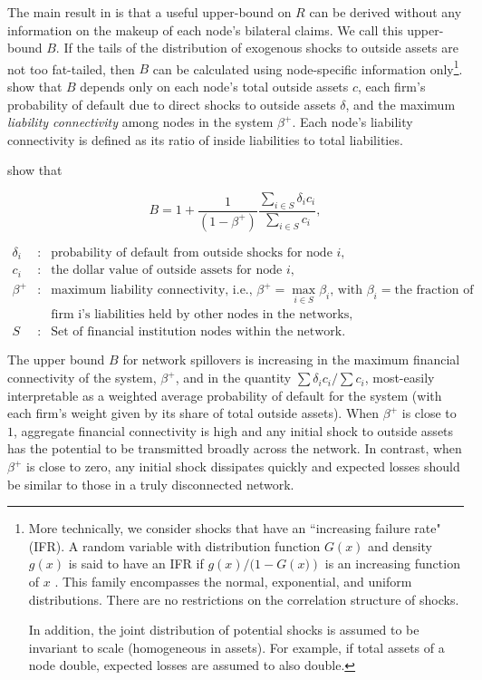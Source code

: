 The main result in \citet{glasserman2015likely} is that a useful upper-bound on $R$ can be derived without any information on the makeup of each node's bilateral claims. We call this upper-bound $B$. If the tails of the distribution of exogenous shocks to outside assets are not too fat-tailed, then $B$ can be calculated using node-specific information only\footnote{More technically, we consider shocks that have an \textquotedblleft increasing failure rate" (IFR). A random variable with distribution function  $G\left( x\right) $ and density $g\left( x\right) $ is said to have an IFR if $g\left( x\right) /(1-G\left( x)\right) $ is an increasing function of $x$ . This family encompasses the normal, exponential, and uniform distributions. There are no restrictions on the correlation structure of shocks.  \par In addition, the joint distribution of potential shocks is assumed to be invariant to scale (homogeneous in assets). For example, if total assets of a node double, expected losses are assumed to also double.}. \citet{glasserman2015likely} show that $B$ depends only on each node's total outside assets $c$, each firm's probability of default due to direct shocks to outside assets $\delta$, and the maximum \textit{liability connectivity} among nodes in the system $\beta^+$. Each node's liability connectivity is defined as its ratio of inside liabilities to total liabilities.

\citet{glasserman2015likely} show that

\begin{equation} \label{eq:B}
B=1+\frac{1}{(1-\beta ^{+})}\frac{\sum_{i \in S} {\delta _{i}c_{i}}}{\sum_{i \in S}{c_{i}}},
\end{equation}

\begin{eqnarray*}
\delta _{i} &:&\text{probability of default from outside shocks for node }i, \\
c_{i} &:&\text{the dollar value of outside assets for node }i, \\
\beta ^{+} &:&\text{maximum liability connectivity, i.e., }\beta^{+}=\max_{i \in S}\beta _{i}\text{, with } \beta_i=\text{the fraction of } \\
&& \text{firm i's liabilities held by other nodes in the networks}, \\
S &:&\text{Set of financial institution nodes within the network.}
\end{eqnarray*}%

The upper bound $B$ for network spillovers is increasing in the maximum financial connectivity of the system, $\beta ^{+}$, and in the quantity $\sum {\delta _{i}c_{i}}/\sum {c_{i}}$, most-easily interpretable as a weighted average probability of default for the system (with each firm's weight given by its share of total outside assets). When $\beta ^{+}$ is close to $1$, aggregate financial connectivity is high and any initial shock to outside assets has the potential to be transmitted broadly across the network. In contrast, when $\beta ^{+}$ is close to zero, any initial shock dissipates quickly and expected losses should be similar to those in a truly disconnected network.

